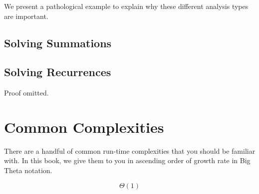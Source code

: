 \documentclass[main.tex]{subfiles}
\begin{document}
We present a pathological example to explain why these different analysis types are important.



\subsection{Solving Summations}




\subsection{Solving Recurrences}



\begin{thm}
\end{thm}

Proof omitted.


\section{Common Complexities}

There are a handful of common run-time complexities that you should be familiar with. In this book, we give them to you in ascending order of growth rate in Big Theta notation.

\begin{defn}[Constant]
	\[\Theta(1)\]
\end{defn}
\end{document}
